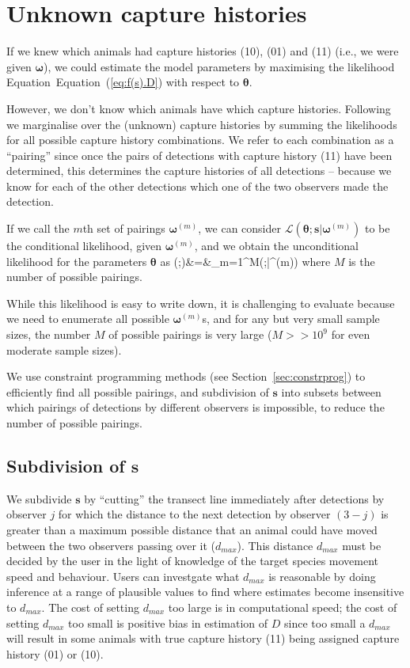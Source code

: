 \documentclass[useAMS, usenatbib, referee]{biom}
\begin{document}
\section{Unknown capture histories}

If we knew which animals had capture histories (10), (01) and (11) (i.e., we were given $\bm{\omega}$), we could estimate the model parameters by maximising the likelihood Equation~Equation~(\ref{eq:f(s).D}) with respect to $\bm{\theta}$.

However, we don't know which animals have which capture histories. Following \cite{Hiby+Lovell:98} we marginalise over the (unknown) capture histories by summing the likelihoods for all possible capture history combinations. We refer to each combination as a ``pairing'' since once the pairs of detections with capture history (11) have been determined, this determines the capture histories of all detections -- because we know for each of the other detections which one of the two observers made the detection.

If we call the $m$th set of pairings $\bm{\omega}^{(m)}$, we can consider $\mathcal{L}(\bm{\theta};\bm{s}|\bm{\omega}^{(m)})$ to be the conditional likelihood, given $\bm{\omega}^{(m)}$, and we obtain the unconditional likelihood for the parameters $\bm{\theta}$ as
\be
{}(\bm{\theta};)&=&\sum_{m=1}^M(\bm{\theta};|\bm{\omega}^{(m)})
\ee
\noindent
where $M$ is the number of possible pairings.

While this likelihood is easy to write down, it is challenging to evaluate because we need to enumerate all possible $\bm{\omega}^{(m)}$s, and for any but very small sample sizes, the number $M$ of possible pairings is very large ($M>>10^9$ for even moderate sample sizes).

We use constraint programming methods (see Section~\ref{sec:constrprog}) to efficiently find all possible pairings, and subdivision of $\bm{s}$ into subsets between which pairings of detections by different observers is impossible, to reduce the number of possible pairings.

\subsection{Subdivision of $\bm{s}$}

We subdivide $\bm{s}$ by ``cutting'' the transect line immediately after detections by observer $j$ for which the distance to the next detection by observer $(3-j)$ is greater than a maximum possible distance that an animal could have moved between the two observers passing over it ($d_{max}$). This distance $d_{max}$ must be decided by the user in the light of knowledge of the target species movement speed and behaviour. Users can investgate what $d_{max}$ is reasonable by doing inference at a range of plausible values to find where estimates become insensitive to $d_{max}$. The cost of setting $d_{max}$ too large is in computational speed; the cost of setting $d_{max}$ too small is positive bias in estimation of $D$ since too small a $d_{max}$ will result in some animals with true capture history (11) being assigned capture history (01) or (10).
\end{document}
